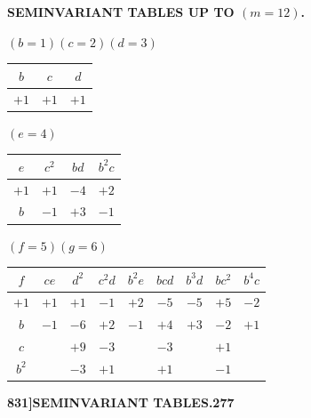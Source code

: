 \documentclass[11pt,a4paper]{book}
\begin{document}
\begin{center}
\textbf{SEMINVARIANT TABLES UP TO $(m = 12)$.}
\end{center}

\medskip

\noindent $(b = 1)$\hfill$(c = 2)$\hfill$(d = 3)$

\begin{center}
\begin{tabular}{|c|c|c|}
\hline
$b$ & $c$ & $d$ \\
\hline
$+1$ & $+1$ & $+1$ \\
\hline
\end{tabular}
\end{center}

\medskip

\noindent $(e = 4)$
\begin{center}
\begin{tabular}{|c|c|c|c|}
\hline
$e$ & $c^2$ & $bd$ & $b^2c$ \\
\hline
$+1$ & $+1$ & $-4$ & $+2$ \\
$b$ & $-1$ & $+3$ & $-1$ \\
\hline
\end{tabular}
\end{center}

\medskip

\noindent $(f = 5)$\hfill$(g = 6)$
\begin{center}
\begin{tabular}{|c|c|c|c|c|c|c|c|c|}
\hline
$f$ & $ce$ & $d^2$ & $c^2d$ & $b^2e$ & $bcd$ & $b^3d$ & $bc^2$ & $b^4c$ \\
\hline
$+1$ & $+1$ & $+1$ & $-1$ & $+2$ & $-5$ & $-5$ & $+5$ & $-2$ \\
$b$ & $-1$ & $-6$ & $+2$ & $-1$ & $+4$ & $+3$ & $-2$ & $+1$ \\
$c$ & & $+9$ & $-3$ & & $-3$ & & $+1$ & \\
$b^2$ & & $-3$ & $+1$ & & $+1$ & & $-1$ & \\
\hline
\end{tabular}
\end{center}

\newpage
\setcounter{page}{277}

\noindent\textbf{831]}\hfill\textbf{SEMINVARIANT TABLES.}\hfill\textbf{277}

\bigskip
\end{document}
